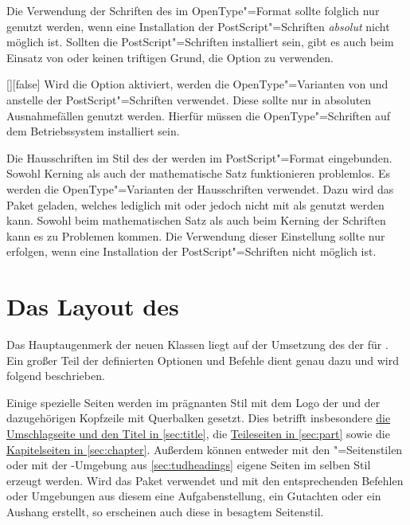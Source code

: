 Die Verwendung der Schriften des \CDs im OpenType"=Format sollte folglich nur 
genutzt werden, wenn eine Installation der PostScript"=Schriften \emph{absolut} 
nicht möglich ist. Sollten die PostScript"=Schriften installiert sein, gibt es 
auch beim Einsatz von  oder  keinen triftigen 
Grund, die Option  zu verwenden.

\begin{Declaration}[v2.02]{[\PBoolean]}[false]%
\printdeclarationlist%
%
Wird die Option aktiviert, werden die OpenType"=Varianten von \Univers und \DIN 
anstelle der PostScript"=Schriften verwendet. Diese sollte nur in absoluten
Ausnahmefällen genutzt werden. Hierfür müssen die OpenType"=Schriften auf dem 
Betriebssystem installiert sein.
\begin{values}
\itemfalse*
  Die Hausschriften im Stil des \CDs der \TnUD werden im PostScript"=Format 
  eingebunden. Sowohl Kerning als auch der mathematische Satz funktionieren 
  problemlos.
\itemtrue*
   Es werden die OpenType"=Varianten der Hausschriften verwendet. Dazu wird das 
   Paket  geladen, welches lediglich mit  
   oder  jedoch nicht mit  als genutzt werden 
   kann. Sowohl beim mathematischen Satz als auch beim Kerning der Schriften 
   kann es zu Problemen kommen. Die Verwendung dieser Einstellung sollte nur 
   erfolgen, wenn eine Installation der PostScript"=Schriften nicht möglich ist.
\end{values}
\end{Declaration}


\section{Das Layout des \CDs}
Das Hauptaugenmerk der neuen Klassen liegt auf der Umsetzung des \CDs der
\TnUD für . Ein großer Teil der definierten Optionen und Befehle
dient genau dazu und wird folgend beschrieben.

Einige spezielle Seiten werden im prägnanten Stil mit dem Logo der \TnUD und 
der dazugehörigen Kopfzeile mit Querbalken gesetzt. Dies betrifft insbesondere 
\hyperref[sec:title]{die Umschlagseite und den Titel in \autoref{sec:title}}, 
die \hyperref[sec:part]{Teileseiten in \autoref{sec:part}} sowie die
\hyperref[sec:chapter]{Kapitelseiten in \autoref{sec:chapter}}. 
Außerdem können entweder mit den "=Seitenstilen oder 
mit der -Umgebung aus \autoref{sec:tudheadings} eigene 
Seiten im selben Stil erzeugt werden. Wird das Paket  
verwendet und mit den entsprechenden Befehlen oder Umgebungen aus diesem eine 
Aufgabenstellung, ein Gutachten oder ein Aushang erstellt, so erscheinen auch 
diese in besagtem Seitenstil.


